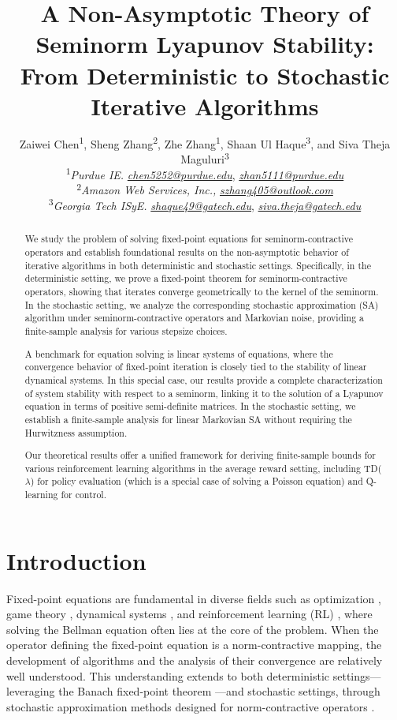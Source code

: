 \documentclass[11 pt]{article}
\title{\LARGE\bfseries A Non-Asymptotic Theory of Seminorm Lyapunov Stability: From Deterministic to Stochastic Iterative Algorithms}
\author{
	Zaiwei Chen\textsuperscript{$1$}, 
	Sheng Zhang\textsuperscript{$2$}, 
	Zhe Zhang\textsuperscript{$1$}, 
	Shaan Ul Haque\textsuperscript{$3$}, and
	Siva Theja Maguluri\textsuperscript{$3$}\\
	{\small\textsuperscript{$1$}\textit{Purdue IE.} \href{mailto:chen5252@purdue.edu}{\textit{chen5252@purdue.edu}}, \href{mailto:zhan5111@purdue.edu}{\textit{zhan5111@purdue.edu}}}\\
	{\small\textsuperscript{$2$}\textit{Amazon Web Services, Inc.,} \href{mailto:szhang405@outlook.com}{\textit{szhang405@outlook.com}}}\\
	{\small\textsuperscript{$3$}\textit{Georgia Tech ISyE.} \href{mailto:shaque49@gatech.edu}{\textit{shaque49@gatech.edu}}, \href{mailto:siva.theja@gatech.edu}{\textit{siva.theja@gatech.edu}}}
}
\date{\vspace{-0.4 in}}
\begin{document}
	\maketitle
	
	\begin{abstract}
		We study the problem of solving fixed-point equations for seminorm-contractive operators and establish foundational results on the non-asymptotic behavior of iterative algorithms in both deterministic and stochastic settings. Specifically, in the deterministic setting, we prove a fixed-point theorem for seminorm-contractive operators, showing that iterates converge geometrically to the kernel of the seminorm. In the stochastic setting, we analyze the corresponding stochastic approximation (SA) algorithm under seminorm-contractive operators and Markovian noise, providing a finite-sample analysis for various stepsize choices. 
		
		A benchmark for equation solving is linear systems of equations, where the convergence behavior of fixed-point iteration is closely tied to the stability of linear dynamical systems. In this special case, our results provide a complete characterization of system stability with respect to a seminorm, linking it to the solution of a Lyapunov equation in terms of positive semi-definite matrices. In the stochastic setting, we establish a finite-sample analysis for linear Markovian SA without requiring the Hurwitzness assumption.  
		
		Our theoretical results offer a unified framework for deriving finite-sample bounds for various reinforcement learning algorithms in the average reward setting, including TD($\lambda$) for policy evaluation (which is a special case of solving a Poisson equation) and Q-learning for control.
	\end{abstract}
	
	
	
	
	
	
	\section{Introduction}\label{sec:intro} 
	Fixed-point equations are fundamental in diverse fields such as optimization \cite{boyd2004convex}, game theory \cite{fudenberg1991game}, dynamical systems \cite{khalil2002nonlinear}, and reinforcement learning (RL) \cite{sutton2018reinforcement}, where solving the Bellman equation often lies at the core of the problem. When the operator defining the fixed-point equation is a norm-contractive mapping, the development of algorithms and the analysis of their convergence are relatively well understood. This understanding extends to both deterministic settings—leveraging the Banach fixed-point theorem \cite{banach1922operations}—and stochastic settings, through stochastic approximation methods designed for norm-contractive operators \cite{robbins1951stochastic,borkar2009stochastic,bertsekas1996neuro}.
	
\end{document}
